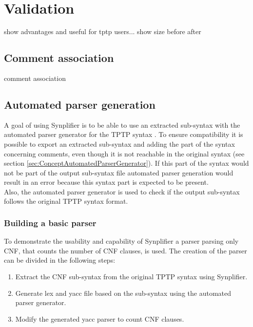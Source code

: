 \chapter{Validation}\label{sec:Validation}
show advantages and useful for tptp users...
show size before after 
\section{Comment association}\label{sec:ValidationCommentAssociation}
comment association


\section{Automated parser generation}\label{sec:ValidationAutomatedParserGeneration}
A goal of using \ac{Synplifier} is to be able to use an extracted sub-syntax with the automated parser generator for the \ac{TPTP} syntax \cite{VS06}.
To ensure compatibility it is possible to export an extracted sub-syntax and adding the part of the syntax concerning comments, even though it is not reachable in the original syntax (see section \ref{sec:ConceptAutomatedParserGenerator}). If this part of the syntax would not be part of the output sub-syntax file automated parser generation would result in an error because this syntax part is expected to be present.\\
Also, the automated parser generator is used to check if the output sub-syntax follows the original \ac{TPTP} syntax format.

\subsection{Building a basic parser}\label{sec:ValidationAutomatedParserGenerationBuildingBasicParser}
To demonstrate the usability and capability of \ac{Synplifier} a parser parsing only \ac{CNF}, that counts the number of \ac{CNF} clauses, is used.
The creation of the parser can be divided in the following steps:
\begin{enumerate}%
	\item Extract the \ac{CNF} sub-syntax from the original \ac{TPTP} syntax using \ac{Synplifier}.
	\item Generate lex and yacc file based on the sub-syntax using the automated parser generator.
	\item Modify the generated yacc parser to count \ac{CNF} clauses.
\end{enumerate}

